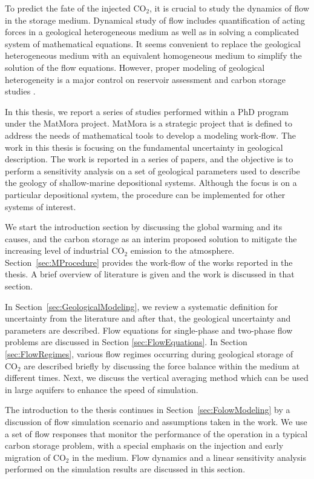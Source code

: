 To predict the fate of the injected $\mbox{CO}_2$, it is crucial to study the dynamics
of flow in the storage medium. Dynamical study of flow includes quantification of
acting forces in a geological heterogeneous medium as well as in solving a
complicated system of mathematical equations. It seems convenient to replace the
geological heterogeneous medium with an equivalent homogeneous medium to simplify the solution of the flow equations. However,
proper modeling of geological heterogeneity is a major control on reservoir
assessment and carbon storage studies
\cite{eaton2006importance,bashore1993importance,melick2009incorporating,
milliken2008effect}.

In this thesis, we report a series of studies performed within a PhD program
under the MatMora project. MatMora is a strategic project that is defined
to address the needs of mathematical tools to develop a modeling work-flow.
The work in this thesis is focusing on the fundamental uncertainty in geological
description. The work is reported in a series of papers, and the objective is to perform a sensitivity analysis on a set of geological parameters used to describe the geology of
shallow-marine depositional systems. Although the focus is on a particular
depositional system, the procedure can be implemented for other systems of
interest. 

We start the introduction section by discussing the global warming and its
causes, and the carbon storage as an interim proposed solution to mitigate the
increasing level of industrial $\mbox{CO}_2$ emission to the atmosphere.
Section~\ref{sec:MProcedure} provides the work-flow of the works reported in the
thesis. A brief overview of literature is given and the work is discussed in
that section. 

In Section~\ref{sec:GeologicalModeling}, we review a systematic definition
for uncertainty from the literature and after that, the geological uncertainty
and parameters are described. Flow equations for single-phase and two-phase flow
problems are discussed in Section \ref{sec:FlowEquations}. In Section
\ref{sec:FlowRegimes}, various flow regimes occurring during geological storage
of $\mbox{CO}_2$ are described briefly by discussing the force balance within
the medium at different times. Next, we discuss the vertical averaging method
which can be used in large aquifers to enhance the speed of simulation.

The introduction to the thesis continues in Section~\ref{sec:FolowModeling} by a discussion of flow simulation scenario and assumptions taken in the work. We use a set of flow responses that monitor the performance of the operation in a typical carbon storage problem, with a special emphasis on the injection and early migration of $\mbox{CO}_2$ in the medium. Flow dynamics and a linear sensitivity analysis performed on the simulation results are discussed in this section. 

